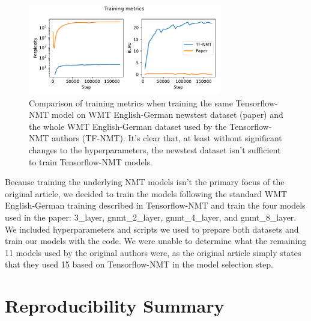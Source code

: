 \begin{figure}
    \centering
    \includegraphics[width=0.75\textwidth]{figures/tf-nmt_paper_training.pdf}
    \caption{Comparison of training metrics when training the same Tensorflow-NMT model on WMT English-German newstest dataset (paper) and the whole WMT English-German dataset used by the Tensorflow-NMT authors (TF-NMT). It's clear that, at least without significant changes to the hyperparameters, the newstest dataset isn't sufficient to train Tensorflow-NMT models.}
    \label{fig:tf-nmt_paper_training}
\end{figure}

Because training the underlying NMT models isn't the primary focus of the original article, we decided to train the models following the standard WMT English-German training described in Tensorflow-NMT and train the four models used in the paper: 3\_layer, gnmt\_2\_layer, gnmt\_4\_layer, and gnmt\_8\_layer. We included hyperparameters and scripts we used to prepare both datasets and train our models with the code. We were unable to determine what the remaining 11 models used by the original authors were, as the original article simply states that they used 15  based on Tensorflow-NMT in the model selection step.



\section*{Reproducibility Summary}


